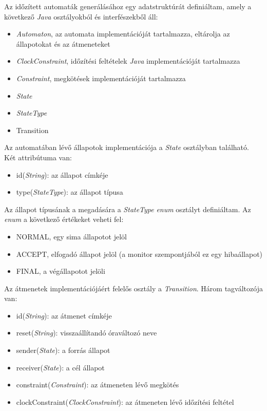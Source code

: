 Az időzített automaták generálásához egy adatstruktúrát definiáltam, amely a következő \textit{Java} osztályokból és interfészekből áll:
\begin{itemize}
    \item \textit{Automaton}, az automata implementációját tartalmazza, eltárolja az állapotokat és az átmeneteket
    \item \textit{ClockConstraint}, időzítési feltételek \textit{Java} implementációját tartalmazza
    \item \textit{Constraint}, megkötések implementációját tartalmazza
    \item \textit{State}
    \item \textit{StateType}
    \item Transition
\end{itemize}

Az automatában lévő állapotok implementációja a \textit{State} osztályban található.
Két attribútuma van:
\begin{itemize}
	\item id(\textit{String}): az állapot címkéje
	\item type(\textit{StateType}): az állapot típusa
\end{itemize}

Az állapot típusának a megadására a \textit{StateType} \textit{enum} osztályt definiáltam.
Az \textit{enum} a következő értékeket veheti fel:
\begin{itemize}
	\item NORMAL, egy sima állapotot jelöl
	\item ACCEPT, elfogadó állapot jelöl (a monitor szempontjából ez egy hibaállapot)
	\item FINAL, a végállapotot jelöli
\end{itemize}

Az átmenetek implementációjáért felelős osztály a \textit{Transition}.
Három tagváltozója van:
\begin{itemize}
	\item id(\textit{String}): az átmenet címkéje
	\item reset(\textit{String}): visszaállítandó óraváltozó neve
	\item sender(\textit{State}): a forrás állapot
	\item receiver(\textit{State}): a cél állapot
	\item constraint(\textit{Constraint}): az átmeneten lévő megkötés
	\item clockConstraint(\textit{ClockConstraint}): az átmeneten lévő időzítési feltétel
\end{itemize}

